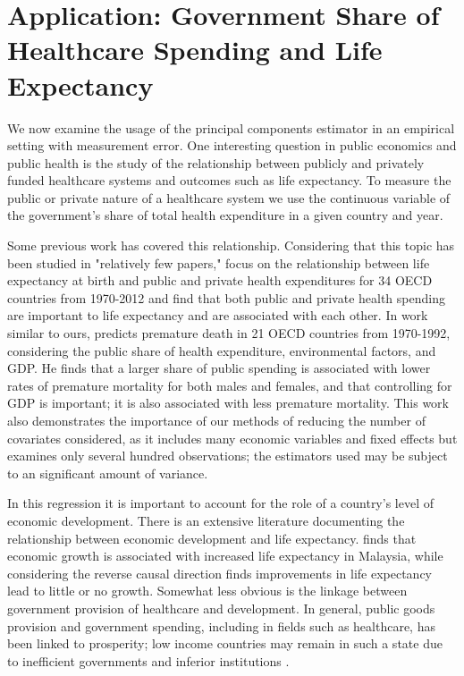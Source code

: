 \documentclass[10pt]{article}
\begin{document}
    \section*{Application: Government Share of Healthcare Spending and Life Expectancy}

        We now examine the usage of the principal components estimator in an empirical setting with measurement error. One interesting question in public economics and public health is the study of the relationship between publicly and privately funded healthcare systems and outcomes such as life expectancy. To measure the public or private nature of a healthcare system we use the continuous variable of the government's share of total health expenditure in a given country and year.

        Some previous work has covered this relationship. Considering that this topic has been studied in "relatively few papers," \cite{linden_life_2017} focus on the relationship between life expectancy at birth and public and private health expenditures for 34 OECD countries from 1970-2012 and find that both public and private health spending are important to life expectancy and are associated with each other. In work similar to ours, \cite{or_determinants_2000} predicts premature death in 21 OECD countries from 1970-1992, considering the public share of health expenditure, environmental factors, and GDP. He finds that a larger share of public spending is associated with lower rates of premature mortality for both males and females, and that controlling for GDP is important; it is also associated with less premature mortality. This work also demonstrates the importance of our methods of reducing the number of covariates considered, as it includes many economic variables and fixed effects but examines only several hundred observations; the estimators used may be subject to an significant amount of variance.

        In this regression it is important to account for the role of a country's level of economic development. There is an extensive literature documenting the relationship between economic development and life expectancy. \cite{ling_testing_2017} finds that economic growth is associated with increased life expectancy in Malaysia, while considering the reverse causal direction \cite{acemoglu_disease_2007} finds improvements in life expectancy lead to little or no growth. Somewhat less obvious is the linkage between government provision of healthcare and development. In general, public goods provision and government spending, including in fields such as healthcare, has been linked to prosperity; low income countries may remain in such a state due to inefficient governments and inferior institutions \citep{wu_impact_2010}.
\end{document}
